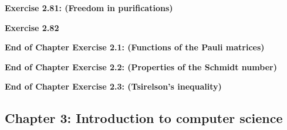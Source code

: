 \documentclass{article}
\begin{document}
\bigskip

\begin{framed}
    \noindent \textbf{Exercise 2.81: (Freedom in purifications)}
    
    \medskip
    
    
\end{framed}

\bigskip

\begin{framed}
    \noindent \textbf{Exercise 2.82}
    
    \medskip
    
    
\end{framed}

\bigskip

\begin{framed}
    \noindent \textbf{End of Chapter Exercise 2.1: (Functions of the Pauli matrices)}
    
    \medskip
    
    
\end{framed}

\bigskip

\begin{framed}
    \noindent \textbf{End of Chapter Exercise 2.2: (Properties of the Schmidt number)}
    
    \medskip
    
    
\end{framed}

\bigskip

\begin{framed}
    \noindent \textbf{End of Chapter Exercise 2.3: (Tsirelson’s inequality)}
    
    \medskip
    
    
\end{framed}

\subsection*{Chapter 3: Introduction to computer science}
\end{document}

